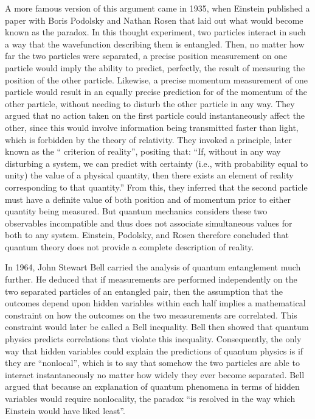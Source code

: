 \documentclass[twoside]{memoir}
\begin{document}
A more famous version of this argument came in 1935, when Einstein published a paper with Boris Podolsky and Nathan Rosen that laid out what would become known as the  paradox. In this thought experiment, two particles interact in such a way that the wavefunction describing them is entangled. Then, no matter how far the two particles were separated, a precise position measurement on one particle would imply the ability to predict, perfectly, the result of measuring the position of the other particle. Likewise, a precise momentum measurement of one particle would result in an equally precise prediction for of the momentum of the other particle, without needing to disturb the other particle in any way. They argued that no action taken on the first particle could instantaneously affect the other, since this would involve information being transmitted faster than light, which is forbidden by the theory of relativity. They invoked a principle, later known as the \enquote{ criterion of reality}, positing that: \enquote{If, without in any way disturbing a system, we can predict with certainty (i.e., with probability equal to unity) the value of a physical quantity, then there exists an element of reality corresponding to that quantity.} From this, they inferred that the second particle must have a definite value of both position and of momentum prior to either quantity being measured. But quantum mechanics considers these two observables incompatible and thus does not associate simultaneous values for both to any system. Einstein, Podolsky, and Rosen therefore concluded that quantum theory does not provide a complete description of reality.

In 1964, John Stewart Bell carried the analysis of quantum entanglement much further. He deduced that if measurements are performed independently on the two separated particles of an entangled pair, then the assumption that the outcomes depend upon hidden variables within each half implies a mathematical constraint on how the outcomes on the two measurements are correlated. This constraint would later be called a Bell inequality. Bell then showed that quantum physics predicts correlations that violate this inequality. Consequently, the only way that hidden variables could explain the predictions of quantum physics is if they are \enquote{nonlocal}, which is to say that somehow the two particles are able to interact instantaneously no matter how widely they ever become separated. Bell argued that because an explanation of quantum phenomena in terms of hidden variables would require nonlocality, the  paradox \enquote{is resolved in the way which Einstein would have liked least}.
\end{document}
